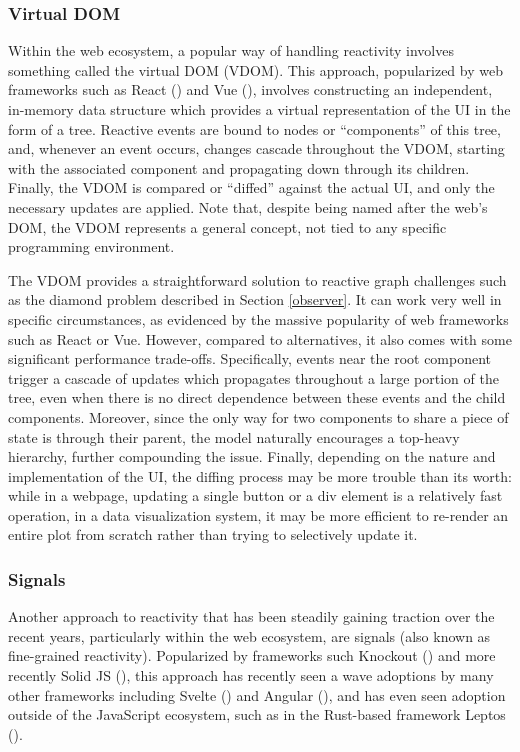 \documentclass[
  openany]{book}
\theoremstyle{definition}
\theoremstyle{definition}
\theoremstyle{definition}
\theoremstyle{definition}
\theoremstyle{remark}
\begin{document}
\subsubsection{Virtual DOM}\label{virtual-dom}

Within the web ecosystem, a popular way of handling reactivity involves something called the virtual DOM (VDOM). This approach, popularized by web frameworks such as React () and Vue (), involves constructing an independent, in-memory data structure which provides a virtual representation of the UI in the form of a tree. Reactive events are bound to nodes or ``components'' of this tree, and, whenever an event occurs, changes cascade throughout the VDOM, starting with the associated component and propagating down through its children. Finally, the VDOM is compared or ``diffed'' against the actual UI, and only the necessary updates are applied. Note that, despite being named after the web's DOM, the VDOM represents a general concept, not tied to any specific programming environment.

The VDOM provides a straightforward solution to reactive graph challenges such as the diamond problem described in Section \ref{observer}. It can work very well in specific circumstances, as evidenced by the massive popularity of web frameworks such as React or Vue. However, compared to alternatives, it also comes with some significant performance trade-offs. Specifically, events near the root component trigger a cascade of updates which propagates throughout a large portion of the tree, even when there is no direct dependence between these events and the child components. Moreover, since the only way for two components to share a piece of state is through their parent, the model naturally encourages a top-heavy hierarchy, further compounding the issue. Finally, depending on the nature and implementation of the UI, the diffing process may be more trouble than its worth: while in a webpage, updating a single button or a div element is a relatively fast operation, in a data visualization system, it may be more efficient to re-render an entire plot from scratch rather than trying to selectively update it.

\subsubsection{Signals}\label{signals}

Another approach to reactivity that has been steadily gaining traction over the recent years, particularly within the web ecosystem, are signals (also known as fine-grained reactivity). Popularized by frameworks such Knockout () and more recently Solid JS (), this approach has recently seen a wave adoptions by many other frameworks including Svelte () and Angular (), and has even seen adoption outside of the JavaScript ecosystem, such as in the Rust-based framework Leptos ().
\end{document}
